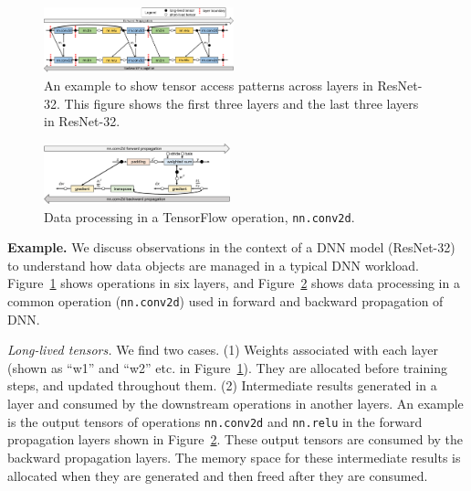 


\begin{figure}
\centering
\includegraphics[width=0.49\textwidth]{figures/tensor_usage.pdf}
\vspace{-20pt}
\caption{\textcolor{jie}{An example to show tensor access patterns across layers in ResNet-32. This figure shows the first three layers and the last three layers in ResNet-32}.}
\vspace{-5pt}
\label{fig:tensor_usage}
\end{figure}
\begin{figure}
\centering
\includegraphics[width=0.48\textwidth]{figures/conv_tensor_usage.pdf}
\vspace{-20pt}
\caption{\textcolor{check}{Data processing in a TensorFlow operation, \texttt{nn.conv2d}.}}
\vspace{-5pt}
\label{fig:conv_tensor_usage}
\end{figure}


\textcolor{check}{
\textbf{Example.} We discuss observations in the context of a DNN model (ResNet-32) to understand how data objects are managed in a typical DNN workload. Figure~\ref{fig:tensor_usage} shows operations in six layers, and Figure~\ref{fig:conv_tensor_usage} shows data processing in a common operation (\texttt{nn.conv2d}) used in forward and backward propagation of DNN. }

\textcolor{check}{\textit{Long-lived tensors.} We find two cases. (1) Weights associated with each layer (shown as ``w1'' and ``w2'' etc. in Figure~\ref{fig:tensor_usage}). They are allocated before training steps, and updated throughout them.  (2) Intermediate results generated in a layer and consumed by the downstream operations in another layers. An example is the output tensors of operations \texttt{nn.conv2d} and \texttt{nn.relu} in the forward propagation layers shown in Figure~\ref{fig:conv_tensor_usage}. These output tensors are consumed by the backward propagation layers. The memory space for these intermediate results is allocated when they are generated and then freed after they are consumed.}


